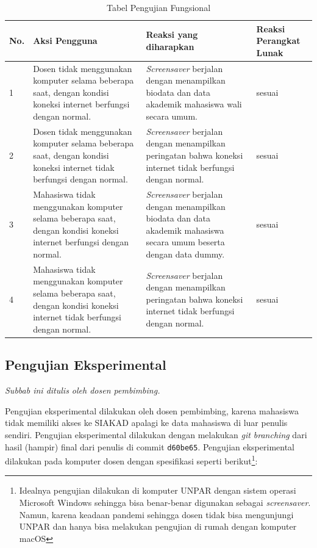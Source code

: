 \begin{table}[H]
	\centering
	\caption{Tabel Pengujian Fungsional}
	\begin{tabular}{|p{0.5cm}| p{5.5cm}| p{5.5cm}| p{3cm}|} \hline
	No.	&	Aksi Pengguna	&	Reaksi yang diharapkan	&	Reaksi Perangkat Lunak \\ \hline
	1 	& Dosen tidak menggunakan komputer selama beberapa saat, dengan kondisi  koneksi internet berfungsi dengan normal.  	&	\textit{Screensaver} berjalan dengan menampilkan biodata dan data akademik mahasiswa wali secara umum. &	sesuai	\\ \hline
	2 	& Dosen tidak menggunakan komputer selama beberapa saat, dengan kondisi koneksi internet tidak berfungsi dengan normal. 	&	\textit{Screensaver} berjalan dengan menampilkan peringatan bahwa koneksi internet tidak berfungsi dengan normal. &	sesuai	\\ \hline 	
	3 	& Mahasiswa tidak menggunakan komputer selama beberapa saat, dengan kondisi  koneksi internet berfungsi dengan normal. 	&	\textit{Screensaver} berjalan dengan menampilkan biodata dan data akademik mahasiswa secara umum beserta dengan data dummy. &	sesuai	\\ \hline 
	4 	& Mahasiswa tidak menggunakan komputer selama beberapa saat, dengan kondisi koneksi internet tidak berfungsi dengan normal. 	&	\textit{Screensaver} berjalan dengan menampilkan peringatan bahwa koneksi internet tidak berfungsi dengan normal. &	sesuai	\\ \hline 
	\end{tabular}
	\label{table:hasilFungsional}
\end{table}


\subsection{Pengujian Eksperimental}
\textit{Subbab ini ditulis oleh dosen pembimbing.}

Pengujian eksperimental dilakukan oleh dosen pembimbing, karena mahasiswa tidak memiliki akses ke SIAKAD apalagi ke data mahasiswa di luar penulis sendiri. Pengujian eksperimental dilakukan dengan melakukan \textit{git branching} dari hasil (hampir) final dari penulis di commit \texttt{d60be65}. Pengujian eksperimental dilakukan pada komputer dosen dengan spesifikasi seperti berikut\footnote{Idealnya pengujian dilakukan di komputer UNPAR dengan sistem operasi Microsoft Windows sehingga bisa benar-benar digunakan sebagai \textit{screensaver}. Namun, karena keadaan pandemi sehingga dosen tidak bisa mengunjungi UNPAR dan hanya bisa melakukan pengujian di rumah dengan komputer macOS}:

